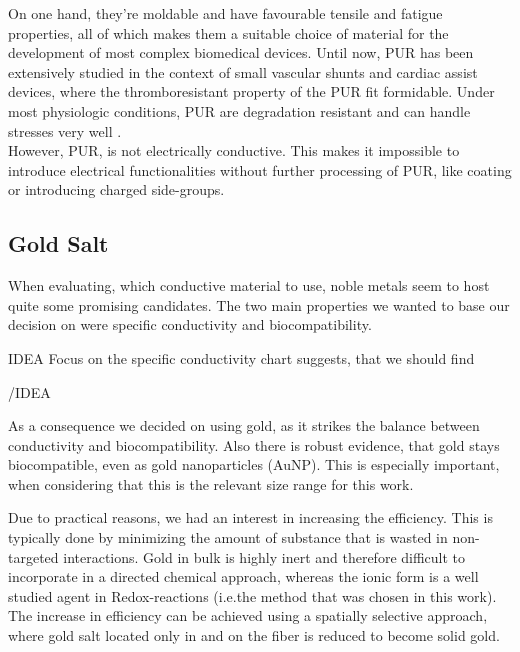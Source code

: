 On one hand, they're moldable and have favourable tensile and fatigue properties, all of which makes them a suitable choice of material for the development of most complex biomedical devices. \cite{Pinchuk}
Until now, PUR has been extensively studied in the context of small vascular shunts and cardiac assist devices, where the thromboresistant property of the PUR fit formidable. Under most physiologic conditions, PUR are degradation resistant and can handle stresses very well \cite{Ulery}.\\



However, PUR, is not electrically conductive. This makes it impossible to introduce electrical functionalities without further processing of PUR, like coating or introducing charged side-groups. 

\subsection{Gold Salt}
\label{subsec:GoldSalt}

When evaluating, which conductive material to use, noble metals seem to
host quite some promising candidates. The two main properties we wanted to
base our decision on were specific conductivity and biocompatibility.

IDEA
Focus on the specific conductivity chart suggests, that we should find 

/IDEA

As a consequence we decided on using gold, as it strikes the balance between conductivity and 
biocompatibility.  Also there is robust evidence, that gold stays biocompatible, even 
as gold nanoparticles (AuNP).  This is especially important, when considering that this is the 
relevant size range for this work. \cite{Liu, Shukla}

Due to practical reasons, we had an interest in increasing the efficiency.  This is typically done by minimizing the amount of substance that is wasted in non-targeted interactions. Gold in bulk is highly inert and therefore difficult to incorporate in a directed chemical approach, whereas the ionic form is a well studied agent in Redox-reactions (i.e.the method that was chosen in this work). The increase in efficiency can be achieved using a spatially selective approach, where gold salt located only in and on the fiber is reduced to become solid gold.

